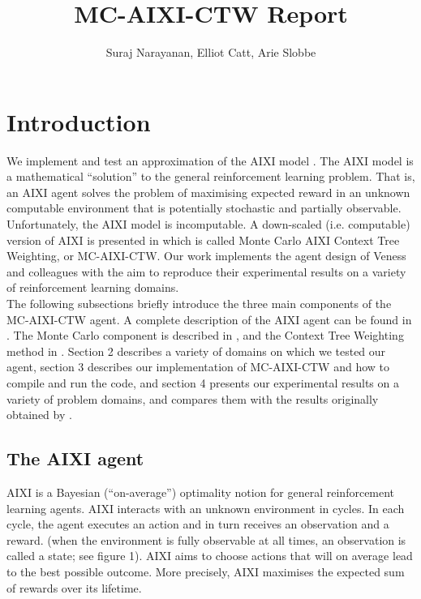 \documentclass{article}
\title{MC-AIXI-CTW Report}
\author{Suraj Narayanan, Elliot Catt, Arie Slobbe}
\theoremstyle{definition}
\newtheorem{primary statistics}[definition]{Primary Statistics}
\newtheorem{auxiliary statistics}[definition]{Auxiliary Statistics}
\begin{document}
\maketitle
\tableofcontents

\newpage

\section{Introduction}
We implement and test an approximation of the AIXI model \citep{hutter2005universal}. The AIXI model is a mathematical “solution” to the general reinforcement learning problem. That is, an AIXI agent solves the problem of maximising expected reward in an unknown computable environment that is potentially stochastic and partially observable. Unfortunately, the AIXI model is incomputable. A down-scaled (i.e. computable) version of AIXI is presented in \citep{veness2011monte} which is called Monte Carlo AIXI Context Tree Weighting, or MC-AIXI-CTW. Our work implements the agent design of Veness and colleagues with the aim to reproduce their experimental results on a variety of reinforcement learning domains. \\ 

The following subsections briefly introduce the three main components of the MC-AIXI-CTW agent. A complete description of the AIXI agent can be found in \citep{hutter2005universal}. The Monte Carlo component is described in \citep{kocsis2006bandit}, and the Context Tree Weighting method in \citep{willems1995context}.  Section 2 describes a variety of domains on which we tested our agent, section 3 describes our implementation of MC-AIXI-CTW and how to compile and run the code, and section 4 presents our experimental results on a variety of problem domains, and compares them with the results originally obtained by \citep{veness2011monte}.

\subsection{The AIXI agent}
AIXI is a Bayesian (``on-average'') optimality notion for general reinforcement learning agents. AIXI interacts with an unknown environment in cycles. In each cycle, the agent executes an action and in turn receives an observation and a reward. (when the environment is fully observable at all times, an observation is called a state; see figure 1). AIXI aims to choose actions that will on average lead to the best possible outcome. More precisely, AIXI maximises the expected sum of rewards over its lifetime. \\
\end{document}
